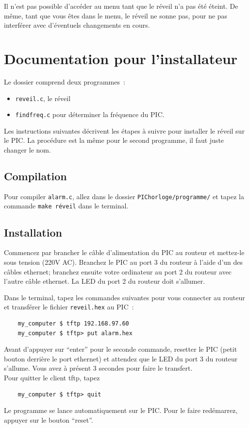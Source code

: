 \documentclass[12pt,a4paper]{article}
\begin{document}
Il n'est pas possible d'accéder au menu tant que le réveil n'a pas été éteint. De même, tant que vous êtes dans le menu, le réveil ne sonne pas, pour ne pas interférer avec d'éventuels changements en cours.

\pagebreak
\section{Documentation pour l'installateur}
Le dossier comprend deux programmes~:
\begin{itemize}
\item \texttt{reveil.c}, le réveil %
\item \texttt{findfreq.c} pour déterminer la fréquence du PIC.
\end{itemize}
Les instructions suivantes décrivent les étapes à suivre pour installer le réveil sur le PIC. La procédure est la même pour le second programme, il faut juste changer le nom.

\subsection{Compilation}
Pour compiler \texttt{alarm.c}, allez dans le dossier \texttt{PIChorloge/programme/} et tapez la commande \texttt{make réveil} dans le terminal.

\subsection{Installation}
Commencez par brancher le câble d'alimentation du PIC au routeur et mettez-le sous tension (220V AC). Branchez le PIC au port 3 du routeur à l'aide d'un des câbles ethernet; branchez ensuite votre ordinateur au port 2 du routeur avec l'autre câble ethernet. La LED du port 2 du routeur doit s'allumer.

Dans le terminal, tapez les commandes suivantes pour vous connecter au routeur et transférer le fichier \texttt{reveil.hex} au PIC~:
\begin{verbatim}
    my_computer $ tftp 192.168.97.60
    my_computer $ tftp> put alarm.hex
\end{verbatim}
Avant d'appuyer sur ``enter'' pour le seconde commande, resetter le PIC (petit bouton derrière le port ethernet) et attendez que le LED du port 3 du routeur s'allume. Vous avez à présent 3 secondes pour faire le transfert.\\
Pour quitter le client tftp, tapez
\begin{verbatim}
    my_computer $ tftp> quit
\end{verbatim}
Le programme se lance automatiquement sur le PIC. Pour le faire redémarrez, appuyer sur le bouton ``reset''.
\end{document}
